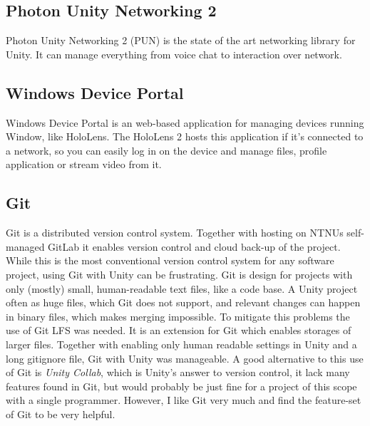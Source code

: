 \subsection*{Photon Unity Networking 2}\label{chap:pun}
Photon Unity Networking 2 (PUN) is the state of the art networking library for Unity. It can manage everything from voice chat to interaction over network. 


\subsection*{Windows Device Portal}\label{chap:wdp}

Windows Device Portal is an web-based application for managing devices running Window, like HoloLens. The HoloLens 2 hosts this application if it's connected to a network, so you can easily log in on the device and manage files, profile application or stream video from it.


\subsection*{Git}\label{chap:git}
Git is a distributed version control system. Together with hosting on NTNUs self-managed GitLab it enables version control and cloud back-up of the project. While this is the most conventional version control system for any software project, using Git with Unity can be frustrating. 
Git is design for projects with only (mostly) small, human-readable text files, like a code base. A Unity project often as huge files, which Git does not support, and relevant changes can happen in binary files, which makes merging impossible. To mitigate this problems the use of Git LFS was needed. It is an extension for Git which enables storages of larger files. Together with enabling only human readable settings in Unity and a long gitignore file, Git with Unity was manageable.
A good alternative to this use of Git is \textit{Unity Collab}, which is Unity's answer to version control, it lack many features found in Git, but would probably be just fine for a project of this scope with a single programmer. However, I like Git very much and find the feature-set of Git to be very helpful. 



